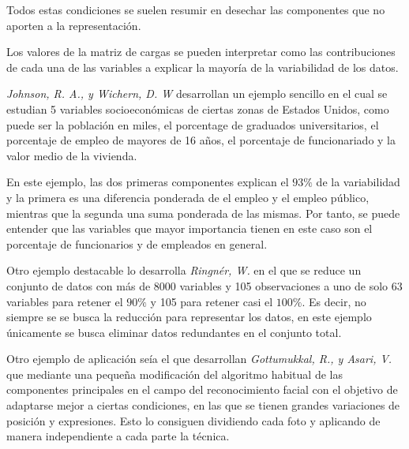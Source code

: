 \noindent Todos estas condiciones se suelen resumir en desechar las componentes que no aporten a la representación. 

\noindent Los valores de la matriz de cargas se pueden interpretar como las contribuciones de cada una de las variables a explicar la mayoría de la variabilidad de los datos.

\noindent\emph{Johnson, R. A., y Wichern, D. W} \cite{Johnson 2007} desarrollan un ejemplo sencillo en el cual se estudian 5 variables socioeconómicas de ciertas zonas de Estados Unidos, como puede ser la población en miles, el porcentage de graduados universitarios, el porcentaje de empleo de mayores de 16 años, el porcentaje de funcionariado y la valor medio de la vivienda.

\noindent En este ejemplo, las dos primeras componentes explican el $93\%$ de la variabilidad y la primera es una diferencia ponderada de el empleo y el empleo público, mientras que la segunda una suma ponderada de las mismas. Por tanto, se puede entender que las variables que mayor importancia tienen en este caso son el porcentaje de funcionarios y de empleados en general.

\noindent Otro ejemplo destacable lo desarrolla \emph{Ringnér, W.}\cite{Ringnér 2008} en el que se reduce un conjunto de datos con más de 8000 variables y 105 observaciones a uno de solo 63 variables para retener el $90\%$ y 105 para retener casi el $100\%$. Es decir, no siempre se se busca la reducción para representar los datos, en este ejemplo únicamente se busca eliminar datos redundantes en el conjunto total. 

\noindent Otro ejemplo de aplicación seía el que desarrollan \emph{Gottumukkal, R., y Asari, V.} \cite {Asari 2004} que mediante una pequeña modificación del algoritmo habitual de las componentes principales en el campo del reconocimiento facial con el objetivo de adaptarse mejor a ciertas condiciones, en las que se tienen grandes variaciones de posición y expresiones. Esto lo consiguen dividiendo cada foto y aplicando de manera independiente a cada parte la técnica. 

